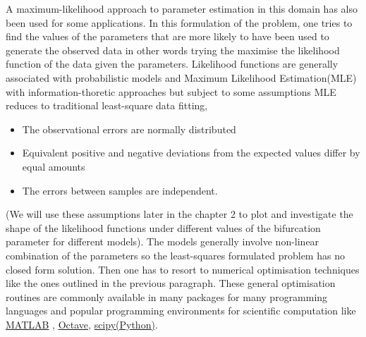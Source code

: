\documentclass[12pt,a4paper,titlepage]{article}
\begin{document}
A maximum-likelihood approach to parameter estimation in this domain has also been used for some applications. In this formulation of the problem, one tries to find the values of the parameters that are more likely to have been used to generate the observed data in other words trying the maximise the likelihood function of the data given the parameters. Likelihood functions are generally associated with probabilistic models and Maximum Likelihood Estimation(MLE) with information-thoretic approaches but subject to some assumptions MLE reduces to traditional least-square data fitting,
\begin{itemize}[noitemsep]
\item{The observational errors are normally distributed}
\item{Equivalent positive and negative deviations from the expected values differ by equal amounts}
\item{The errors between samples are independent.}
\end{itemize}
(We will use these assumptions later in the chapter 2 to plot and investigate the shape of the likelihood functions under different values of the bifurcation parameter for different models). The models generally involve non-linear combination of the parameters so the least-squares formulated problem has no closed form solution. Then one has to resort to numerical optimisation techniques like the ones outlined in the previous paragraph. These general optimisation routines are commonly available in many packages for many programming languages and popular programming environments for scientific computation like \href{http://www.mathworks.co.uk/products/optimization/}{MATLAB} , \href{http://www.gnu.org/software/octave/doc/interpreter/Optimization.html}{Octave}, \href{http://docs.scipy.org/doc/scipy/reference/tutorial/optimize.html}{scipy(Python)}.
\end{document}

